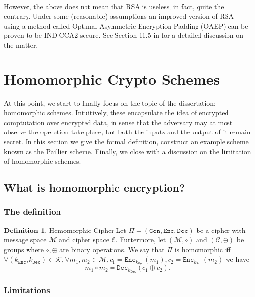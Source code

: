 \documentclass{article}
\theoremstyle{definition}
\newtheorem{definition}{Definition}[section]
\newcommand{\Enc}{\texttt{Enc}}
\newcommand{\Dec}{\texttt{Dec}}
\newcommand{\Gen}{\texttt{Gen}}
\newcommand{\M}{\mathcal{M}}
\renewcommand{\C}{\mathcal{C}}
\newcommand{\K}{\mathcal{K}}
\begin{document}
\paragraph{} However, the above does not mean that RSA is useless, in fact,
quite the contrary. Under some (reasonable) assumptions an improved version of
RSA using a method called Optimal Asymmetric Encryption Padding (OAEP) can be
proven to be IND-CCA2 secure. See Section 11.5 in \cite{katz2014introduction}
for a detailed discussion on the matter.
\section{Homomorphic Crypto Schemes}
\paragraph{}
At this point, we start to finally focus on the topic of the dissertation:
homomorphic schemes. Intuitively, these encapsulate the idea of encrypted
comptutation over encrypted data, in sense that the adversary may at most
observe the operation take place, but both the inputs and the output of it
remain secret. In this section we give the formal definition, construct an
example scheme known as the Paillier scheme. Finally, we close with a discussion
on the limitation of homomorphic schemes.
\subsection{What is homomorphic encryption?}
\subsubsection{The definition}
\begin{definition}{Homomorphic Cipher}
  Let $\Pi = (\Gen, \Enc, \Dec)$ be a cipher with message space $\M$ and cipher
  space $\C$. Furtermore, let $(\M, \circ)$ and $(\C, \oplus)$ be groups where
  $\circ, \oplus$ are binary operations.
  We say that $\Pi$ is homomorphic iff $\forall (k_\Enc, k_\Dec) \in \K, \forall
  m_1, m_2 \in \M, c_1 = \Enc_{k_\Enc}(m_1), c_2 = \Enc_{k_\Enc}(m_2)$ we have
  \[
    m_1 \circ m_2 = \Dec_{k_\Dec}(c_1 \oplus c_2).
  \]
\end{definition}
\subsubsection{Limitations}
\end{document}
